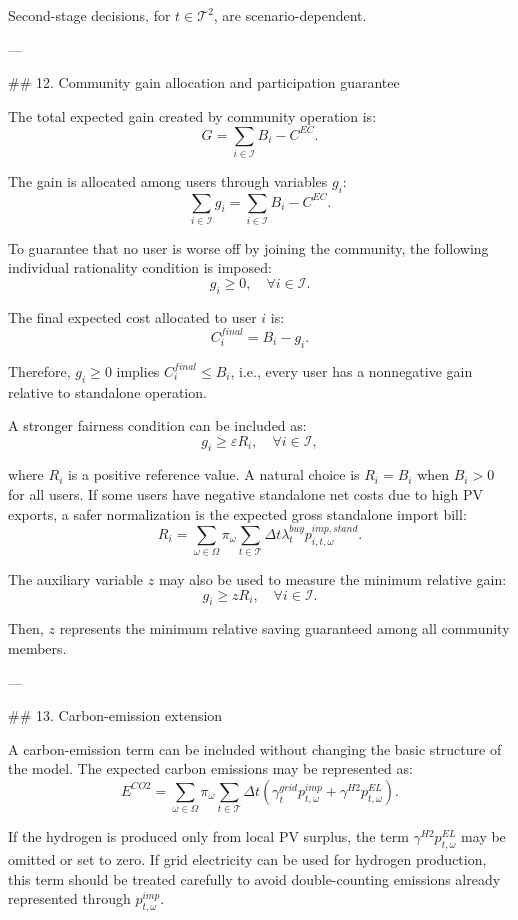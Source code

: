 Second-stage decisions, for $t\in\mathcal{T}^{2}$, are scenario-dependent.

---

## 12. Community gain allocation and participation guarantee

The total expected gain created by community operation is:
$$ G=\sum_{i\in\mathcal{I}}B_i-C^{EC}. $$

The gain is allocated among users through variables $g_i$:
$$ \sum_{i\in\mathcal{I}}g_i=\sum_{i\in\mathcal{I}}B_i-C^{EC}. $$

To guarantee that no user is worse off by joining the community, the following individual rationality condition is imposed:
$$ g_i\ge 0,
\quad \forall i\in\mathcal{I}. $$

The final expected cost allocated to user $i$ is:
$$ C^{final}_i=B_i-g_i. $$

Therefore, $g_i\ge 0$ implies $C^{final}_i\le B_i$, i.e., every user has a nonnegative gain relative to standalone operation.

A stronger fairness condition can be included as:
$$ g_i\ge \varepsilon R_i,
\quad \forall i\in\mathcal{I}, $$

where $R_i$ is a positive reference value. A natural choice is $R_i=B_i$ when $B_i>0$ for all users. If some users have negative standalone net costs due to high PV exports, a safer normalization is the expected gross standalone import bill:
$$ R_i=\sum_{\omega\in\Omega}\pi_{\omega}\sum_{t\in\mathcal{T}}\Delta t\lambda^{buy}_{t}p^{imp,stand}_{i,t,\omega}. $$

The auxiliary variable $z$ may also be used to measure the minimum relative gain:
$$ g_i\ge zR_i,
\quad \forall i\in\mathcal{I}. $$

Then, $z$ represents the minimum relative saving guaranteed among all community members.

---

## 13. Carbon-emission extension

A carbon-emission term can be included without changing the basic structure of the model. The expected carbon emissions may be represented as:
$$ E^{CO2}=\sum_{\omega\in\Omega}\pi_{\omega}
\sum_{t\in\mathcal{T}}\Delta t
\left(
\gamma^{grid}_{t}p^{imp}_{t,\omega}
+\gamma^{H2}p^{EL}_{t,\omega}
\right). $$

If the hydrogen is produced only from local PV surplus, the term $\gamma^{H2}p^{EL}_{t,\omega}$ may be omitted or set to zero. If grid electricity can be used for hydrogen production, this term should be treated carefully to avoid double-counting emissions already represented through $p^{imp}_{t,\omega}$.

